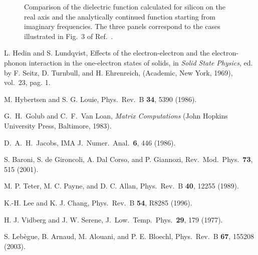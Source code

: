 \documentclass[twocolumn,prb,showpacs,superscriptaddress]{revtex4}
\begin{document}
\begin  {figure}
\begin  {center}
\end    {center}
\caption{\label{fig1}
        Comparison of the dielectric function calculated for silicon 
        on the real axis and the analytically continued function starting
        from imaginary frequencies. The three panels correspond to the
        cases illustrated in Fig.\ 3 of Ref.\ .
        }
\end    {figure}


\begin{thebibliography}{99}

L. Hedin and S. Lundqvist,
Effects of the electron-electron and the electron-phonon interaction in
the one-electron states of solids,
in {\it Solid State Physics}, ed. by F. Seitz, D. Turnbull, and
H. Ehrenreich, (Academic, New York, 1969), vol.\ 23, pag. 1.

M. Hybertsen and S. G. Louie, 
Phys.\ Rev.\ B {\bf 34}, 5390 (1986).

G.\ H.\ Golub and C.\ F.\ Van Loan, {\it Matrix Computations} (John Hopkins University Press, Baltimore, 1983).

D.\ A.\ H.\ Jacobs,
IMA J.\ Numer.\ Anal.\ {\bf 6}, 446 (1986).

S. Baroni, S. de Gironcoli, A. Dal Corso, and P. Giannozi, 
Rev.\ Mod.\ Phys.\ {\bf 73}, 515 (2001).

M. P. Teter, M. C. Payne, and D. C. Allan,
Phys.\ Rev.\ B {\bf 40}, 12255 (1989).

K.-H. Lee and K. J. Chang,
Phys.\ Rev.\ B {\bf 54}, R8285 (1996).

H. J. Vidberg and J. W. Serene,
J.\ Low.\ Temp.\ Phys.\ {\bf 29}, 179 (1977).

S. Leb\`egue, B. Arnaud, M. Alouani, and P. E. Bloechl,
Phys.\ Rev.\ B {\bf 67}, 155208 (2003).


\end{thebibliography}
\end{document}
